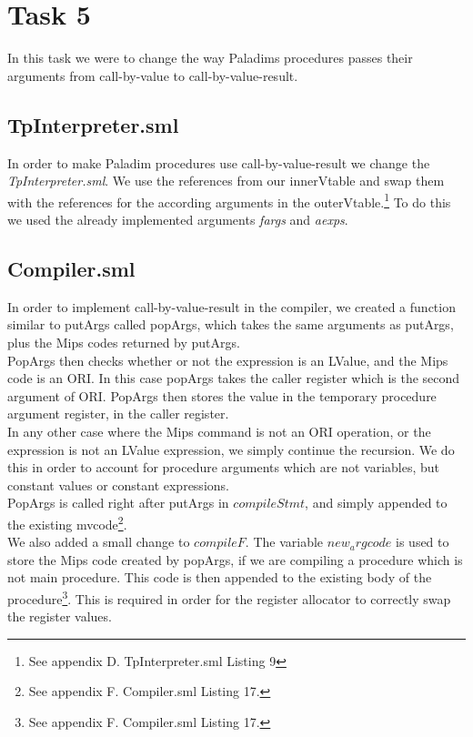 \documentclass[12pt,a4paper,english]{article}
\begin{document}
\section{Task 5}
In this task we were to change the way Paladims procedures passes their arguments from call-by-value to call-by-value-result.
\subsection{TpInterpreter.sml}
In order to make Paladim procedures use call-by-value-result we change the \textit{TpInterpreter.sml}. We use the references from our innerVtable and swap them with the references for the according arguments in the outerVtable.\footnote{See appendix D. TpInterpreter.sml Listing 9} To do this we used the already implemented arguments \textit{fargs} and \textit{aexps}.

\subsection{Compiler.sml}
In order to implement call-by-value-result in the compiler, we created a function similar to putArgs called popArgs, which takes the same arguments as putArgs, plus the Mips codes returned by putArgs. \\
PopArgs then checks whether or not the expression is an LValue, and the Mips code is an ORI. In this case popArgs takes the caller register which is the second argument of ORI. PopArgs then stores the value in the temporary procedure argument register, in the caller register. \\
In any other case where the Mips command is not an ORI operation, or the expression is not an LValue expression, we simply continue the recursion. We do this in order to account for procedure arguments which are not variables, but constant values or constant expressions. \\

PopArgs is called right after putArgs in $compileStmt$, and simply appended to the existing mvcode\footnote{See appendix F. Compiler.sml Listing 17.}.\\

We also added a small change to $compileF$. The variable $new_argcode$ is used to store the Mips code created by popArgs, if we are compiling a procedure which is not main procedure. This code is then appended to the existing body of the procedure\footnote{See appendix F. Compiler.sml Listing 17.}. This is required in order for the register allocator to correctly swap the register values. 
\end{document}
